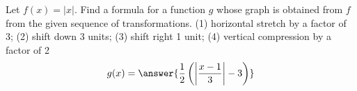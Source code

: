 \documentclass{ximera}
\author{Kenneth Berglund}
\begin{document}
\begin{exercise}
Let $f(x) = |x|$. Find a formula for a function $g$ whose graph is obtained from $f$ from the given
sequence of transformations.
(1) horizontal stretch by a factor of 3; (2) shift down 3 units; (3) shift right 1 unit; (4) vertical compression by a factor of 2
\[
g(x)=\answer{\frac{1}{2}\left(\left|\frac{x - 1}{3}\right| - 3\right)}
\]
\end{exercise}
\end{document}

